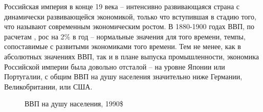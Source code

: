 \documentclass[a4paper,12pt]{article}
\begin{document}

Российская империя в конце 19 века -- интенсивно развивающаяся страна с динамически развивающейся экономикой, только что вступившая в стадию того, что называют современным экономическим ростом. В 1880-1900 годах ВВП, по расчетам \citet{gregory_russian_1983}, рос на 2\% в год – нормальные значения для того времени, темпы, сопоставимые с развитыми экономиками того времени. Тем не менее, как в абсолютных значениях ВВП, так и в плане выпуска промышленности, экономика Российской империи была довольно отсталой – на уровне Японии или Португалии, с общим ВВП на душу населения значительно ниже Германии, Великобритании, или США.

\begin{figure}[h!]
	\centering
	\caption{ВВП на душу населения, 1990\$ \citep{maddison_project_2018}}
	
\end{figure}

\end{document}
